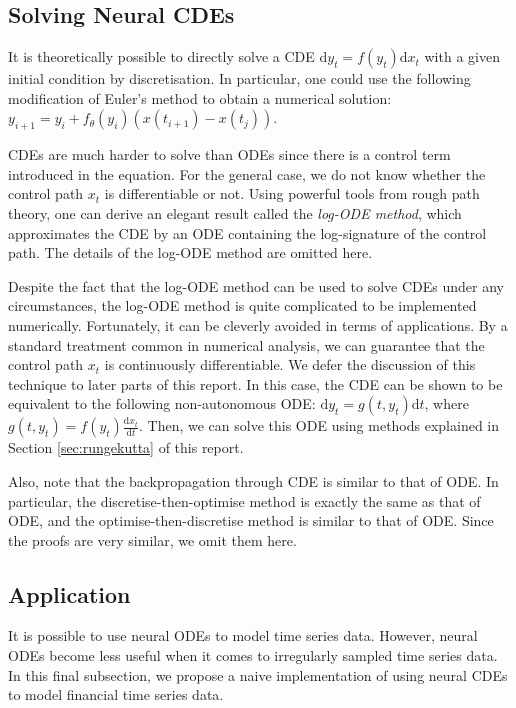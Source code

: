 \documentclass[a4paper,11pt,titlepage]{article}
\theoremstyle{definition}
\theoremstyle{plain}
\theoremstyle{remark}
\begin{document}
\subsection{Solving Neural CDEs}

It is theoretically possible to directly solve a CDE $\mathrm{d}y_t = f(y_t)\mathrm{d}x_t$ with a given initial condition by discretisation. In particular, one could use the following modification of Euler's method to obtain a numerical solution: $y_{i+1}=y_i+f_\theta(y_i)(x(t_{i+1})-x(t_j))$.

CDEs are much harder to solve than ODEs since there is a control term introduced in the equation. For the general case, we do not know whether the control path $x_t$ is differentiable or not. Using powerful tools from rough path theory, one can derive an elegant result called the \textit{log-ODE method}, which approximates the CDE by an ODE containing the log-signature of the control path. \cite{morrill2021} The details of the log-ODE method are omitted here.

Despite the fact that the log-ODE method can be used to solve CDEs under any circumstances, the log-ODE method is quite complicated to be implemented numerically. Fortunately, it can be cleverly avoided in terms of applications. By a standard treatment common in numerical analysis, we can guarantee that the control path $x_t$ is continuously differentiable. We defer the discussion of this technique to later parts of this report. In this case, the CDE can be shown to be equivalent to the following non-autonomous ODE: $\mathrm{d}y_t=g(t,y_t)\mathrm{d}t$, where $g(t,y_t)=f(y_t)\frac{\mathrm{d}x_t}{\mathrm{d}t}$. Then, we can solve this ODE using methods explained in Section \ref{sec:rungekutta} of this report.

Also, note that the backpropagation through CDE is similar to that of ODE. In particular, the discretise-then-optimise method is exactly the same as that of ODE, and the optimise-then-discretise method is similar to that of ODE. Since the proofs are very similar, we omit them here.

\subsection{Application}

It is possible to use neural ODEs to model time series data. However, neural ODEs become less useful when it comes to irregularly sampled time series data. In this final subsection, we propose a naive implementation of using neural CDEs to model financial time series data.
\end{document}
